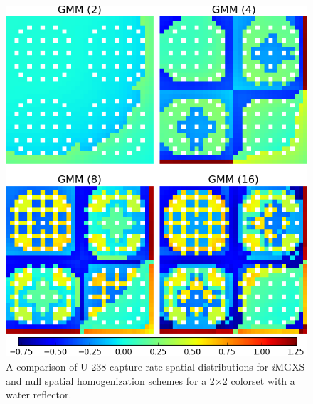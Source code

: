 \begin{figure}[h!]
\centering
\includegraphics[width=0.9\linewidth]{figures/results/compare/reflector/compare-capt}
\vspace{2mm}
\caption[U-238 capture rate comparison for a 2$\times$2 colorset with reflector]{A comparison of U-238 capture rate spatial distributions for \textit{i}\ac{MGXS} and null spatial homogenization schemes for a 2$\times$2 colorset with a water reflector.}
\label{fig:chap11-assm-refl-capt-rates-comp}
\end{figure}

\clearpage

